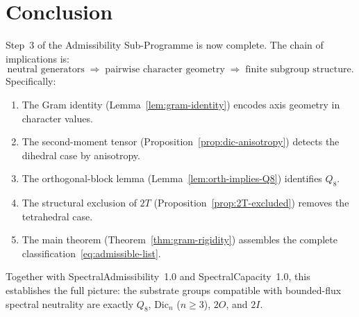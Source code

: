 \section{Conclusion}
  \label{sec:conclusion}

  Step~3 of the Admissibility Sub-Programme is now complete.
  The chain of implications is:
  \[
    \text{neutral generators}
    \;\Longrightarrow\;
    \text{pairwise character geometry}
    \;\Longrightarrow\;
    \text{finite subgroup structure}.
  \]
  Specifically:
  \begin{enumerate}
    \item The Gram identity (Lemma~\ref{lem:gram-identity}) encodes axis geometry in
    character values.
    \item The second-moment tensor (Proposition~\ref{prop:dic-anisotropy}) detects
    the dihedral case by anisotropy.
    \item The orthogonal-block lemma (Lemma~\ref{lem:orth-implies-Q8}) identifies $Q_8$.
    \item The structural exclusion of $2T$ (Proposition~\ref{prop:2T-excluded}) removes
    the tetrahedral case.
    \item The main theorem (Theorem~\ref{thm:gram-rigidity}) assembles the complete
    classification~\eqref{eq:admissible-list}.
  \end{enumerate}
  Together with SpectralAdmissibility~1.0 and SpectralCapacity~1.0, this establishes
  the full picture: the substrate groups compatible with bounded-flux spectral
  neutrality are exactly $Q_8$, $\mathrm{Dic}_n$ ($n \ge 3$), $2O$, and $2I$.
